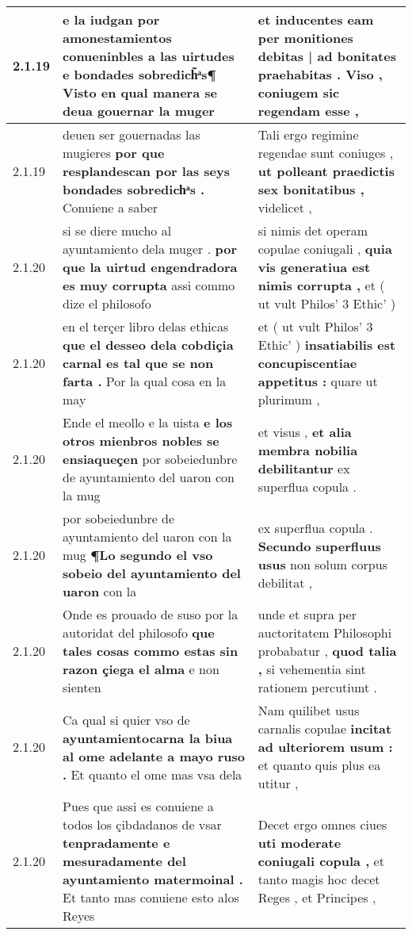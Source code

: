 \begin{tabular}{|p{1cm}|p{6.5cm}|p{6.5cm}|}
2.1.19 & e la iudgan \textbf{ por amonestamientos conueninbles a las uirtudes e bondades sobredich̃ͣs¶ } Visto en qual manera se deua gouernar la muger & et inducentes eam \textbf{ per monitiones debitas | ad bonitates praehabitas . } Viso , coniugem sic regendam esse , \\\hline
2.1.19 & deuen ser gouernadas las mugieres \textbf{ por que resplandescan por las seys bondades sobredichͣs . } Conuiene a saber & Tali ergo regimine regendae sunt coniuges , \textbf{ ut polleant praedictis sex bonitatibus , } videlicet , \\\hline
2.1.20 & si se diere mucho al ayuntamiento dela muger . \textbf{ por que la uirtud engendradora es muy corrupta } assi commo dize el philosofo & si nimis det operam copulae coniugali , \textbf{ quia vis generatiua est nimis corrupta , } et ( ut vult Philos’ 3 Ethic’ ) \\\hline
2.1.20 & en el terçer libro delas ethicas \textbf{ que el desseo dela cobdiçia carnal es tal que se non farta . } Por la qual cosa en la may & et ( ut vult Philos’ 3 Ethic’ ) \textbf{ insatiabilis est concupiscentiae appetitus : } quare ut plurimum , \\\hline
2.1.20 & Ende el meollo e la uista \textbf{ e los otros mienbros nobles se ensiaqueçen } por sobeiedunbre de ayuntamiento del uaron con la mug & et visus , \textbf{ et alia membra nobilia debilitantur } ex superflua copula . \\\hline
2.1.20 & por sobeiedunbre de ayuntamiento del uaron con la mug \textbf{ ¶Lo segundo el vso sobeio del ayuntamiento del uaron } con la & ex superflua copula . \textbf{ Secundo superfluus usus } non solum corpus debilitat , \\\hline
2.1.20 & Onde es prouado de suso por la autoridat del philosofo \textbf{ que tales cosas commo estas sin razon çiega el alma } e non sienten & unde et supra per auctoritatem Philosophi probabatur , \textbf{ quod talia , } si vehementia sint rationem percutiunt . \\\hline
2.1.20 & Ca qual si quier vso de \textbf{ ayuntamientocarna la biua al ome adelante a mayo ruso . } Et quanto el ome mas vsa dela & Nam quilibet usus carnalis copulae \textbf{ incitat ad ulteriorem usum : } et quanto quis plus ea utitur , \\\hline
2.1.20 & Pues que assi es conuiene a todos los çibdadanos de vsar \textbf{ tenpradamente e mesuradamente del ayuntamiento matermoinal . } Et tanto mas conuiene esto alos Reyes & Decet ergo omnes ciues \textbf{ uti moderate coniugali copula , } et tanto magis hoc decet Reges , et Principes , \\\hline

\end{tabular}
